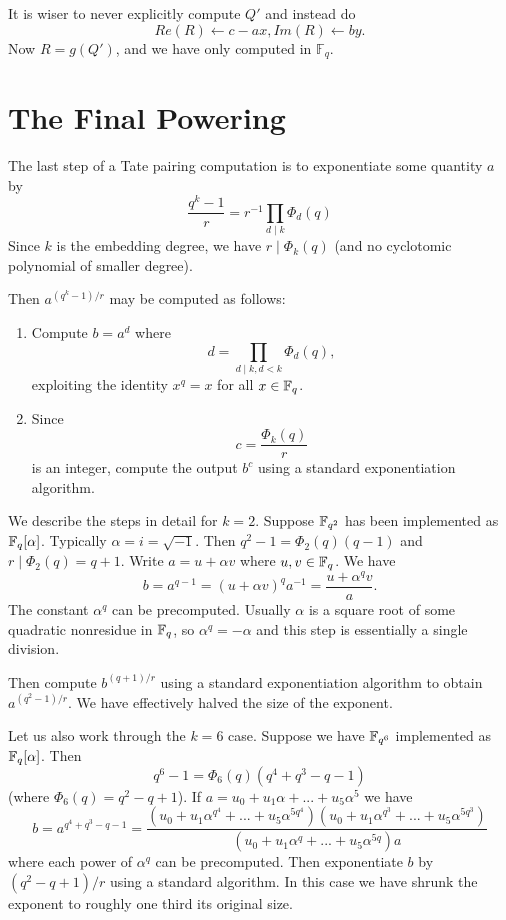It is wiser to never explicitly compute $Q'$ and instead do
\[ Re(R) \gets c - a x , Im(R) \gets b y .\]
Now $R = g(Q')$, and we have only computed in $\mathbb{F}_q$.

\section {The Final Powering}

The last step of a Tate pairing computation is
to exponentiate some quantity $a$ by
\[ \frac{q^k-1}{r} = r^{-1} \prod_{d\mid k} \Phi_d(q) \]
Since $k$ is the embedding degree, we have $r \mid \Phi_k(q)$ (and no
cyclotomic polynomial of smaller degree).

Then $a^{(q^k-1)/r}$ may be computed as follows:
\begin{enumerate}
\item
Compute $b = a^d $ where
\[ d = \prod_{d\mid k, d<k} \Phi_d(q) , \]
exploiting the identity $x^q = x$ for all $x \in \mathbb{F}_q$.
\item
Since
\[ c = \frac{\Phi_k(q)}{r} \]
is an integer, compute the output $b^c$
using a standard exponentiation algorithm.
\end{enumerate}

We describe the steps in detail
for $k = 2$. Suppose $\mathbb{F}_{q^2}$ has been implemented
as $\mathbb{F}_q[\alpha]$. Typically $\alpha = i = \sqrt{-1}$.
Then $q^2 - 1 = \Phi_2(q)(q-1)$ and
$r \mid \Phi_2(q) = q + 1$. Write $a = u + \alpha v$ where $u,v \in \mathbb{F}_q$.
We have
\[ b = a^{q-1} = (u + \alpha v)^q a^{-1} = \frac{u + \alpha^q v}{a} .\]
The constant $\alpha^q$ can be precomputed. Usually $\alpha$ is a square root
of some quadratic nonresidue in $\mathbb{F}_q$, so $\alpha^q = -\alpha$ and
this step is essentially a single division.

Then compute $b^{(q+1)/r}$ using a standard exponentiation algorithm
to obtain $a^{(q^2-1)/r}$. We have effectively halved the size of the exponent.

Let us also work through the $k = 6$ case. Suppose we have $\mathbb{F}_{q^6}$
implemented as $\mathbb{F}_q[\alpha]$. Then
\[ q^6 - 1 = \Phi_6(q) (q^4 + q^3 - q - 1)\]
(where $\Phi_6(q) = q^2 - q + 1$).
If $a = u_0 + u_1 \alpha + ... + u_5 \alpha^5$ we have
\[ b =
a^{q^4 + q^3 - q - 1}
= \frac{
(u_0 + u_1 \alpha^{q^4} + ... + u_5 \alpha^{5q^4})
(u_0 + u_1 \alpha^{q^3} + ... + u_5 \alpha^{5q^3})}
{
(u_0 + u_1 \alpha^q + ... + u_5 \alpha^{5q})a
}
\]
where each power of $\alpha^q$ can be precomputed. Then exponentiate $b$
by $(q^2 - q + 1)/r$ using a standard algorithm.
In this case we have shrunk the exponent to roughly one third its original
size.

